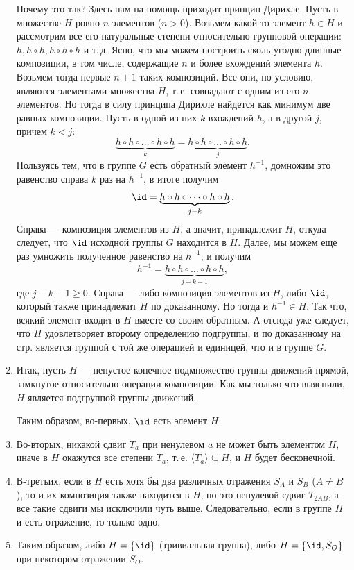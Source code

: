 \begin{enumerate}
Почему это так? Здесь нам на помощь приходит принцип Дирихле. Пусть в множестве $H$ ровно $n$ элементов ($n>0$). Возьмем какой-то элемент $h\in H$ и рассмотрим все его натуральные степени относительно групповой операции: $h, h\circ h, h\circ h\circ h$ и т.\,д. Ясно, что мы можем построить сколь угодно длинные композиции, в том числе, содержащие $n$ и более вхождений элемента $h$. Возьмем тогда первые $n+1$ таких композиций. Все они, по условию, являются элементами множества $H$, т.\,е. совпадают с одним из его $n$ элементов. Но тогда в силу принципа Дирихле найдется как минимум две равных композиции. Пусть в одной из них $k$ вхождений $h$, а в другой $j$, причем $k<j$:
$$
\underbrace{h\circ h\circ\dots\circ h\circ h}_{k} = \underbrace{h\circ h\circ\dots\circ h\circ h}_{j}.
$$
Пользуясь тем, что в группе $G$ есть обратный элемент $h^{-1}$, домножим это равенство справа $k$ раз на $h^{-1}$, в итоге получим
$$
\id = \underbrace{h\circ h\circ\dots\circ h\circ h}_{j-k}.
$$
Справа --- композиция элементов из $H$, а значит, принадлежит $H$, откуда следует, что $\id$ исходной группы $G$ находится в $H$. Далее, мы можем еще раз умножить полученное равенство на $h^{-1}$, и получим
$$
h^{-1} = \underbrace{h\circ h\circ\dots\circ h\circ h}_{j-k-1},
$$
где $j-k-1\ge 0$. Справа --- либо композиция элементов из $H$, либо $\id$, который также принадлежит $H$ по доказанному. Но тогда и $h^{-1}\in H$. Так что, всякий элемент входит в $H$ вместе со своим обратным. А отсюда уже следует, что $H$ удовлетворяет второму определению подгруппы, и по доказанному на стр. \pageref{Subgroup} является группой с той же операцией и единицей, что и в группе $G$.

\item Итак, пусть $H$ --- непустое конечное подмножество группы движений прямой, замкнутое относительно операции композиции. Как мы только что выяснили, $H$ является подгруппой группы движений.

Таким образом, во-первых, $\id$ есть элемент $H$.

\item Во-вторых, никакой сдвиг $T_a$ при ненулевом $a$ не может быть элементом $H$, иначе в $H$ окажутся все степени $T_a$, т.\,е. $\langle T_a\rangle \subseteq H$, и $H$ будет бесконечной.
\item В-третьих, если в $H$ есть хотя бы два различных отражения $S_A$ и $S_B$ ($A\ne B$), то и их композиция также находится в $H$, но это ненулевой сдвиг $T_{2AB}$, а все такие сдвиги мы исключили чуть выше. Следовательно, если в группе $H$ и есть отражение, то только одно.
\item Таким образом, либо $H=\{\id\}$ (тривиальная группа), либо $H=\{\id, S_O\}$ при некотором отражении $S_O$.
\end{enumerate}

